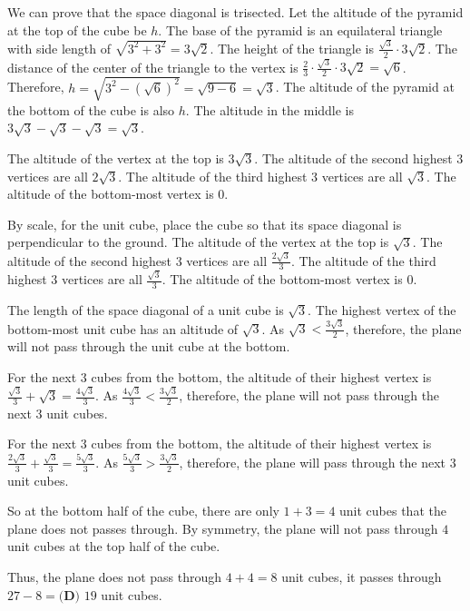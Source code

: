 \begin{enumerate}
 We can prove that the space diagonal is trisected. Let the altitude of the pyramid at the top of the cube be $h$. The base of the pyramid is an equilateral triangle with side length of $\sqrt{3^2+3^2}=3\sqrt{2}$. The height of the triangle is $\frac{ \sqrt{3} }{2} \cdot 3\sqrt{2}$. The distance of the center of the triangle to the vertex is $\frac23 \cdot \frac{ \sqrt{3} }{2} \cdot 3\sqrt{2} = \sqrt {6}$. Therefore, $h = \sqrt{3^2-(\sqrt {6})^2} = \sqrt{9-6}=\sqrt{3}$. The altitude of the pyramid at the bottom of the cube is also $h$. The altitude in the middle is $3\sqrt{3}-\sqrt{3}-\sqrt{3}=\sqrt{3}$.

 The altitude of the vertex at the top is $3\sqrt{3}$. The altitude of the second highest $3$ vertices are all $2\sqrt{3}$. The altitude of the third highest $3$ vertices are all $\sqrt{3}$. The altitude of the bottom-most vertex is $0$.

 By scale, for the unit cube, place the cube so that its space diagonal is perpendicular to the ground. The altitude of the vertex at the top is $\sqrt{3}$. The altitude of the second highest $3$ vertices are all $\frac{2\sqrt{3}}{3}$. The altitude of the third highest $3$ vertices are all $\frac{\sqrt{3}}{3}$. The altitude of the bottom-most vertex is $0$.

 The length of the space diagonal of a unit cube is $\sqrt{3}$. The highest vertex of the bottom-most unit cube has an altitude of $\sqrt{3}$. As $\sqrt{3} < \frac{3\sqrt{3}}{2}$, therefore, the plane will not pass through the unit cube at the bottom.

 For the next $3$ cubes from the bottom, the altitude of their highest vertex is $\frac{\sqrt{3}}{3} + \sqrt{3} = \frac{4\sqrt{3}}{3}$. As $\frac{4\sqrt{3}}{3} < \frac{3\sqrt{3}}{2}$, therefore, the plane will not pass through the next $3$ unit cubes.

 For the next $3$ cubes from the bottom, the altitude of their highest vertex is $\frac{2\sqrt{3}}{3} + \frac{\sqrt{3}}{3} = \frac{5\sqrt{3}}{3}$. As $\frac{5\sqrt{3}}{3} > \frac{3\sqrt{3}}{2}$, therefore, the plane will pass through the next $3$ unit cubes.

 So at the bottom half of the cube, there are only $1+3 = 4$ unit cubes that the plane does not passes through. By symmetry, the plane will not pass through $4$ unit cubes at the top half of the cube.

 Thus, the plane does not pass through $4+4 = 8$ unit cubes, it passes through $27-8=\boxed{\textbf{(D) } 19}$ unit cubes.

 


\end{enumerate}